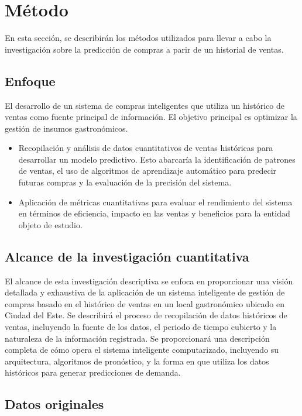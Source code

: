 \fancyhead{}
\fancyfoot{}
\cfoot{\thepage}


\chapter{Método}
En esta sección, se describirán los métodos utilizados para llevar a cabo la investigación sobre la predicción de compras a parir de un historial de ventas.

\section{Enfoque}
El desarrollo de un sistema de compras inteligentes que utiliza un histórico de ventas como fuente principal de información. El objetivo principal es optimizar la gestión de insumos gastronómicos.

\begin{itemize}
\item Recopilación y análisis de datos cuantitativos de ventas históricas para desarrollar un modelo predictivo. Esto abarcaría la identificación de patrones de ventas, el uso de algoritmos de aprendizaje automático para predecir futuras compras y la evaluación de la precisión del sistema. 
\item Aplicación de métricas cuantitativas para evaluar el rendimiento del sistema en términos de eficiencia, impacto en las ventas y beneficios para la entidad objeto de estudio.

\end{itemize}

\section{Alcance de la investigación cuantitativa}
El alcance de esta investigación descriptiva se enfoca en proporcionar una visión detallada y exhaustiva de la aplicación de un sistema inteligente de gestión de compras basado en el histórico de ventas en un local gastronómico ubicado en Ciudad del Este. 
Se describirá el proceso de recopilación de datos históricos de ventas, incluyendo la fuente de los datos, el periodo de tiempo cubierto y la naturaleza de la información registrada.
Se proporcionará una descripción completa de cómo opera el sistema inteligente computarizado, incluyendo su arquitectura, algoritmos de pronóstico, y la forma en que utiliza los datos históricos para generar predicciones de demanda.

\section{Datos originales}

